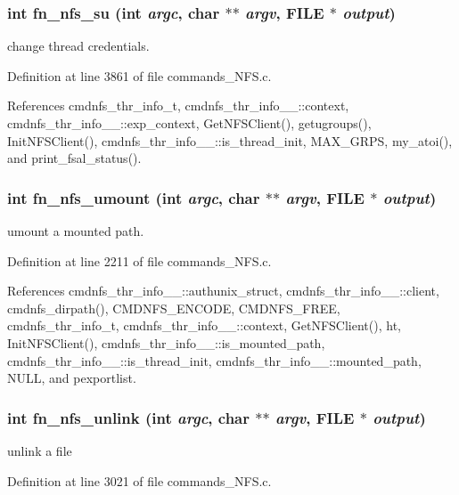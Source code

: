 \subsubsection{\setlength{\rightskip}{0pt plus 5cm}int fn\_\-nfs\_\-su (int {\em argc}, char $\ast$$\ast$ {\em argv}, FILE $\ast$ {\em output})}\label{commands__NFS_8c_a54}


change thread credentials. 

Definition at line 3861 of file commands\_\-NFS.c.

References cmdnfs\_\-thr\_\-info\_\-t, cmdnfs\_\-thr\_\-info\_\-\_\-::context, cmdnfs\_\-thr\_\-info\_\-\_\-::exp\_\-context, Get\-NFSClient(), getugroups(), Init\-NFSClient(), cmdnfs\_\-thr\_\-info\_\-\_\-::is\_\-thread\_\-init, MAX\_\-GRPS, my\_\-atoi(), and print\_\-fsal\_\-status().
\subsubsection{\setlength{\rightskip}{0pt plus 5cm}int fn\_\-nfs\_\-umount (int {\em argc}, char $\ast$$\ast$ {\em argv}, FILE $\ast$ {\em output})}\label{commands__NFS_8c_a42}


umount a mounted path. 

Definition at line 2211 of file commands\_\-NFS.c.

References cmdnfs\_\-thr\_\-info\_\-\_\-::authunix\_\-struct, cmdnfs\_\-thr\_\-info\_\-\_\-::client, cmdnfs\_\-dirpath(), CMDNFS\_\-ENCODE, CMDNFS\_\-FREE, cmdnfs\_\-thr\_\-info\_\-t, cmdnfs\_\-thr\_\-info\_\-\_\-::context, Get\-NFSClient(), ht, Init\-NFSClient(), cmdnfs\_\-thr\_\-info\_\-\_\-::is\_\-mounted\_\-path, cmdnfs\_\-thr\_\-info\_\-\_\-::is\_\-thread\_\-init, cmdnfs\_\-thr\_\-info\_\-\_\-::mounted\_\-path, NULL, and pexportlist.
\subsubsection{\setlength{\rightskip}{0pt plus 5cm}int fn\_\-nfs\_\-unlink (int {\em argc}, char $\ast$$\ast$ {\em argv}, FILE $\ast$ {\em output})}\label{commands__NFS_8c_a48}


unlink a file 

Definition at line 3021 of file commands\_\-NFS.c.


